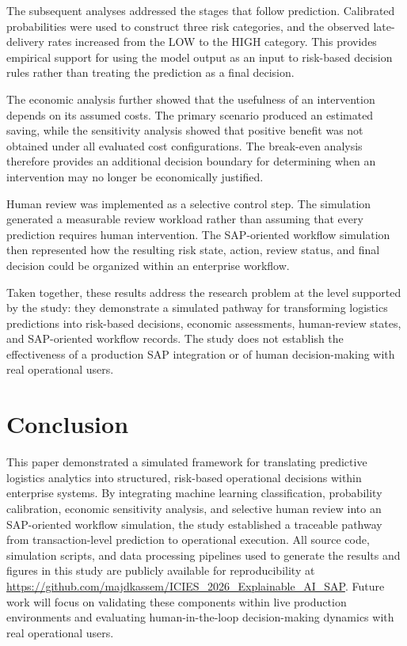\documentclass[manuscript, screen, review]{acmart}
\begin{document}
The subsequent analyses addressed the stages that follow prediction.
Calibrated probabilities were used to construct three risk categories,
and the observed late-delivery rates increased from the LOW to the HIGH
category. This provides empirical support for using the model output as
an input to risk-based decision rules rather than treating the prediction
as a final decision.

The economic analysis further showed that the usefulness of an
intervention depends on its assumed costs. The primary scenario produced
an estimated saving, while the sensitivity analysis showed that positive
benefit was not obtained under all evaluated cost configurations. The
break-even analysis therefore provides an additional decision boundary
for determining when an intervention may no longer be economically
justified.

Human review was implemented as a selective control step. The
simulation generated a measurable review workload rather than assuming
that every prediction requires human intervention. The SAP-oriented
workflow simulation then represented how the resulting risk state,
action, review status, and final decision could be organized within an
enterprise workflow.

Taken together, these results address the research problem at the level
supported by the study: they demonstrate a simulated pathway for
transforming logistics predictions into risk-based decisions, economic
assessments, human-review states, and SAP-oriented workflow records.
The study does not establish the effectiveness of a production SAP
integration or of human decision-making with real operational users.
\section{Conclusion}

This paper demonstrated a simulated framework for translating predictive logistics analytics into structured, risk-based operational decisions within enterprise systems. By integrating machine learning classification, probability calibration, economic sensitivity analysis, and selective human review into an SAP-oriented workflow simulation, the study established a traceable pathway from transaction-level prediction to operational execution. All source code, simulation scripts, and data processing pipelines used to generate the results and figures in this study are publicly available for reproducibility at \url{https://github.com/majdkassem/ICIES_2026_Explainable_AI_SAP}. Future work will focus on validating these components within live production environments and evaluating human-in-the-loop decision-making dynamics with real operational users.



\end{document}

